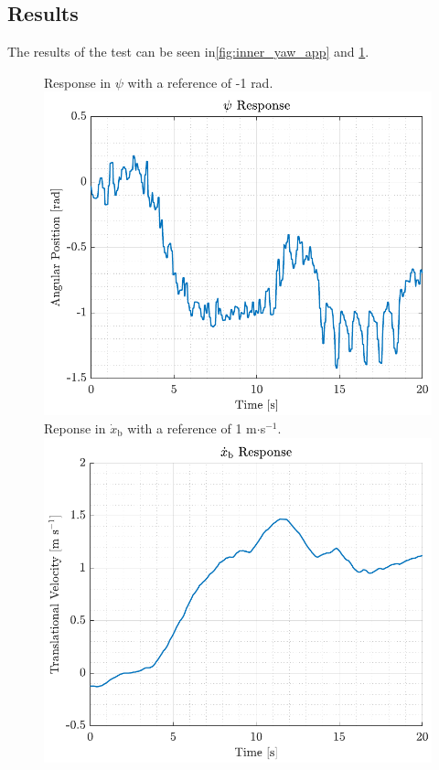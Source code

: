 \subsection*{Results}
The results of the test can be seen in\autoref{fig:inner_yaw_app} and \ref{fig:inner_xbdot_app}.
\begin{figure}[H]
    \captionbox 
    {   
        Response in $\psi$ with a reference of -1 rad.
        \label{fig:inner_yaw_app}
    }                                                                 
    {                                                                  
        \includegraphics[width=.45\textwidth]{figures/inner_yaw}         
    }                                                                    
    \hspace{5pt}                                                          
    \captionbox  
    {      
        Reponse in $\dot{x}_\mathrm{b}$ with a reference of 1 m$\cdot$s$^{-1}$.
        \label{fig:inner_xbdot_app}
    }                                                                          
    {
        \includegraphics[width=.45\textwidth]{figures/inner_xbdot}
    }
\end{figure}

